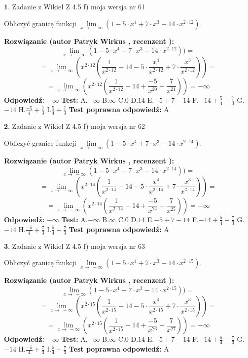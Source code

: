 \documentclass[12pt, a4paper]{article}
\theoremstyle{definition} %
\newtheorem{zad}{}
\newcommand{\zadStart}[1]{\begin{zad}#1\newline}
\newcommand{\zadStop}{\end{zad}}
\newcommand{\rozwStart}[2]{\noindent \textbf{Rozwiązanie (autor #1 , recenzent #2): }\newline}
\newcommand{\rozwStop}{\newline}
\newcommand{\odpStart}{\noindent \textbf{Odpowiedź:}\newline}
\newcommand{\odpStop}{\newline}
\newcommand{\testStart}{\noindent \textbf{Test:}\newline}
\newcommand{\testStop}{\newline}
\newcommand{\kluczStart}{\noindent \textbf{Test poprawna odpowiedź:}\newline}
\newcommand{\kluczStop}{\newline}
\begin{document}
\zadStart{Zadanie z Wikieł Z 4.5 f) moja wersja nr 61}



Obliczyć granicę funkcji  $\lim\limits_{x\to\ -\infty}(1 - 5 \cdot x^{4}+7 \cdot x^{3}- 14 \cdot x^{2\cdot12})$.
\zadStop
\rozwStart{Patryk Wirkus}{}
$$\lim\limits_{x\to\ -\infty}(1 - 5 \cdot x^{4}+7 \cdot x^{3}- 14 \cdot x^{2\cdot12}))=$$
$$=\lim\limits_{x\to\ -\infty}(x^{2\cdot12}(\frac{1}{x^{2\cdot12}}-14 -5 \cdot \frac{x^{4}}{x^{2\cdot12}}+7 \cdot \frac{x^{3}}{x^{2\cdot12}}))=$$
$$=\lim\limits_{x\to\ -\infty}(x^{2\cdot12}(\frac{1}{x^{2\cdot12}}-14 + \frac{-5}{x^{20}}+ \frac{7}{x^{21}}))=-\infty$$
\rozwStop
\odpStart
$-\infty$
\odpStop
\testStart
A.$-\infty$ B.$\infty$ C.$0$ D.$14$ E.$-5 + 7 - 14$
F.$-14+\frac{5}{4}+\frac{7}{3}$ G.$-14$
H.$\frac{-5}{4}+\frac{7}{3}$
I.$\frac{5}{4}+\frac{7}{3}$
\testStop
\kluczStart
A
\kluczStop



\zadStart{Zadanie z Wikieł Z 4.5 f) moja wersja nr 62}



Obliczyć granicę funkcji  $\lim\limits_{x\to\ -\infty}(1 - 5 \cdot x^{4}+7 \cdot x^{3}- 14 \cdot x^{2\cdot14})$.
\zadStop
\rozwStart{Patryk Wirkus}{}
$$\lim\limits_{x\to\ -\infty}(1 - 5 \cdot x^{4}+7 \cdot x^{3}- 14 \cdot x^{2\cdot14}))=$$
$$=\lim\limits_{x\to\ -\infty}(x^{2\cdot14}(\frac{1}{x^{2\cdot14}}-14 -5 \cdot \frac{x^{4}}{x^{2\cdot14}}+7 \cdot \frac{x^{3}}{x^{2\cdot14}}))=$$
$$=\lim\limits_{x\to\ -\infty}(x^{2\cdot14}(\frac{1}{x^{2\cdot14}}-14 + \frac{-5}{x^{24}}+ \frac{7}{x^{25}}))=-\infty$$
\rozwStop
\odpStart
$-\infty$
\odpStop
\testStart
A.$-\infty$ B.$\infty$ C.$0$ D.$14$ E.$-5 + 7 - 14$
F.$-14+\frac{5}{4}+\frac{7}{3}$ G.$-14$
H.$\frac{-5}{4}+\frac{7}{3}$
I.$\frac{5}{4}+\frac{7}{3}$
\testStop
\kluczStart
A
\kluczStop



\zadStart{Zadanie z Wikieł Z 4.5 f) moja wersja nr 63}



Obliczyć granicę funkcji  $\lim\limits_{x\to\ -\infty}(1 - 5 \cdot x^{4}+7 \cdot x^{3}- 14 \cdot x^{2\cdot15})$.
\zadStop
\rozwStart{Patryk Wirkus}{}
$$\lim\limits_{x\to\ -\infty}(1 - 5 \cdot x^{4}+7 \cdot x^{3}- 14 \cdot x^{2\cdot15}))=$$
$$=\lim\limits_{x\to\ -\infty}(x^{2\cdot15}(\frac{1}{x^{2\cdot15}}-14 -5 \cdot \frac{x^{4}}{x^{2\cdot15}}+7 \cdot \frac{x^{3}}{x^{2\cdot15}}))=$$
$$=\lim\limits_{x\to\ -\infty}(x^{2\cdot15}(\frac{1}{x^{2\cdot15}}-14 + \frac{-5}{x^{26}}+ \frac{7}{x^{27}}))=-\infty$$
\rozwStop
\odpStart
$-\infty$
\odpStop
\testStart
A.$-\infty$ B.$\infty$ C.$0$ D.$14$ E.$-5 + 7 - 14$
F.$-14+\frac{5}{4}+\frac{7}{3}$ G.$-14$
H.$\frac{-5}{4}+\frac{7}{3}$
I.$\frac{5}{4}+\frac{7}{3}$
\testStop
\kluczStart
A
\kluczStop
\end{document}
